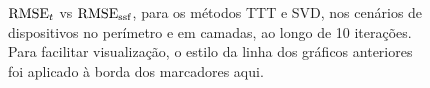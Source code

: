 \begin{figure}[t]
\begin{subfigure}[t]{0.6\linewidth}
    \end{subfigure}

    \vspace*{.5em}
    \caption{ $\operatorname{RMSE}_{t}$ vs $\operatorname{RMSE}_{\operatorname{ssf}}$, para os métodos TTT e SVD, nos cenários de dispositivos no perímetro e em camadas, ao longo de 10 iterações. Para facilitar visualização, o estilo da linha dos gráficos anteriores foi aplicado à borda dos marcadores aqui.}
    \label{fig:sec7:tt_vs_ssf_it-final}
\end{figure}